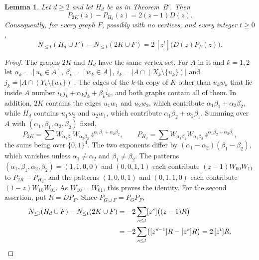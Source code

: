 \documentclass[11pt]{article}
\newtheorem{lemma}[theorem]{Lemma}
\theoremstyle{remark}
\newcommand{\Nle}[1]{N_{\le #1}}
\begin{document}
\begin{lemma}\label{lem:switch}
Let $d\ge2$ and let $H_d$ be as in Theorem~B$'$. Then
\[
 P_{2K}(z)-P_{H_d}(z)=2(z-1)D(z).
\]
Consequently, for every graph $F$, possibly with no vertices, and every
integer $t\ge0$,
\[
 \Nle t(H_d\cup F)-\Nle t(2K\cup F)=2\,[z^t]\bigl(D(z)P_F(z)\bigr).
\]
\end{lemma}
\begin{proof}
The graphs $2K$ and $H_d$ have the same vertex set. For $A$ in it and $k=1,2$
let $\alpha_k=[u_k\in A]$, $\beta_k=[w_k\in A]$,
$i_k=|A\cap(X_k\setminus\{u_k\})|$ and $j_k=|A\cap(Y_k\setminus\{w_k\})|$.
The edges of the $k$-th copy of $K$ other than $u_kw_k$ that lie inside $A$
number $i_kj_k+\alpha_kj_k+\beta_ki_k$, and both graphs contain all of them.
In addition, $2K$ contains the edges $u_1w_1$ and $u_2w_2$, which contribute
$\alpha_1\beta_1+\alpha_2\beta_2$, while $H_d$ contains $u_1w_2$ and
$u_2w_1$, which contribute $\alpha_1\beta_2+\alpha_2\beta_1$. Summing over
$A$ with $(\alpha_1,\beta_1,\alpha_2,\beta_2)$ fixed,
\[
 P_{2K}=\sum W_{\alpha_1\beta_1}W_{\alpha_2\beta_2}\,
 z^{\alpha_1\beta_1+\alpha_2\beta_2},\qquad
 P_{H_d}=\sum W_{\alpha_1\beta_1}W_{\alpha_2\beta_2}\,
 z^{\alpha_1\beta_2+\alpha_2\beta_1},
\]
the sums being over $\{0,1\}^4$. The two exponents differ by
$(\alpha_1-\alpha_2)(\beta_1-\beta_2)$, which vanishes unless
$\alpha_1\ne\alpha_2$ and $\beta_1\ne\beta_2$. The patterns
$(\alpha_1,\beta_1,\alpha_2,\beta_2)=(1,1,0,0)$ and $(0,0,1,1)$ each
contribute $(z-1)W_{00}W_{11}$ to $P_{2K}-P_{H_d}$, and the patterns
$(1,0,0,1)$ and $(0,1,1,0)$ each contribute $(1-z)W_{10}W_{01}$. As
$W_{10}=W_{01}$, this proves the identity. For the second assertion, put
$R=DP_F$. Since $P_{G\cup F}=P_GP_F$,
\begin{align*}
 \Nle t(H_d\cup F)-\Nle t(2K\cup F)
 &=-2\sum_{s\le t}[z^s]\bigl((z-1)R\bigr)\\
 &=-2\sum_{s\le t}\bigl([z^{s-1}]R-[z^s]R\bigr)=2\,[z^t]R.\qedhere
\end{align*}
\end{proof}
\end{document}

